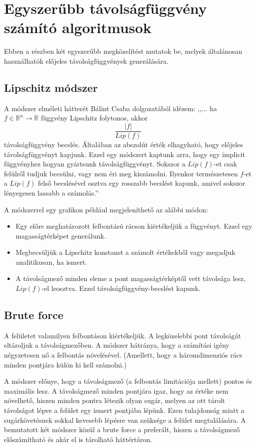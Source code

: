 \section{Egyszerűbb távolságfüggvény számító algoritmusok}

Ebben a részben két egyszerűbb megközelítést mutatok be, melyek általánosan használhatók előjeles távolságfüggvények generálására.

\subsection{Lipschitz módszer}
A módszer elméleti hátterét Bálint Csaba dolgozatából \cite[18. o.]{BalintCsaba} idézem: ,,$\dots$ ha $f \in \mathbb{R}^n \rightarrow \mathbb{R}$ függvény Lipschitz folytonos, akkor
$$ \frac{|f|}{Lip(f)} $$
távolságfüggvény becslés. Általában az abszolút érték elhagyható, hogy előjeles távolságfüggvényt kapjunk. Ezzel egy módszert kaptunk arra, hogy egy implicit függvényhez hogyan gyártsunk távolságfüggvényt. Sokszor a $Lip(f)$-et csak felülről tudjuk becsülni, vagy nem éri meg kiszámolni. Ilyenkor természetesen $f$-et a $Lip(f)$ felső becslésével osztva egy rosszabb becslést kapunk, amivel sokszor lényegesen lassabb a számolás.''

A módszerrel egy grafikon például megjeleníthető az alábbi módon:
\begin{itemize}
	\item Egy előre meghatározott felbontású rácson kiértékeljük a függvényt. Ezzel egy magasságtérképet generálunk.
	\item Megbecsüljük a Lipschitz konstanst a számolt értékekből vagy megadjuk analitikusan, ha ismert.
	\item A távolságmező minden eleme a pont magasságtérképtől vett távolsága lesz, $Lip(f)$-el leosztva. Ezzel távolságfüggvény-becslést kapunk.
\end{itemize}

\subsection{Brute force}
A felületet valamilyen felbontáson kiértékeljük. A legközelebbi pont távolságát eltároljuk a távolságmezőben. A módszer hátránya, hogy a számítási igény négyzetesen nő a felbontás növelésével. (Amellett, hogy a háromdimenziós rács minden pontjára külön ki kell számolni.)

A módszer előnye, hogy a távolságmező (a felbontás limitációja mellett) pontos és maximális lesz. A távolságmező minden pontjára igaz, hogy az értéke nem növelhető, hiszen minden pontra létezik olyan sugár, melyen az ott tárolt távolságot lépve a felület egy ismert pontjába lépünk. Ezen tulajdonság miatt a sugárkövetésnek sokkal kevesebb lépésre van szüksége a felület megtalálására. A bemutatott két módszer közül a brute force a preferált, hiszen a távolságmező előszámítható és akár el is tárolható háttértáron.


